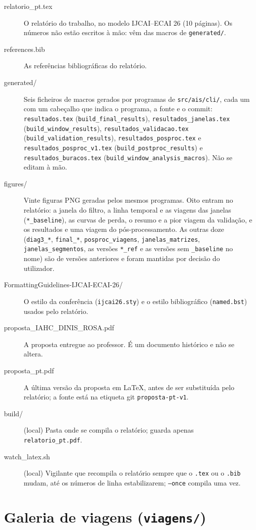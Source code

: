 \documentclass[11pt,a4paper]{article}
\newcommand{\f}[1]{\texttt{#1}}
\begin{document}
\begin{description}
\item[relatorio\_pt.tex] O relatório do trabalho, no modelo IJCAI--ECAI 26 (10 páginas). Os números
  não estão escritos à mão: vêm das macros de \f{generated/}.
\item[references.bib] As referências bibliográficas do relatório.
\item[generated/] Seis ficheiros de macros gerados por programas de \f{src/ais/cli/}, cada um com
  um cabeçalho que indica o programa, a fonte e o commit: \f{resultados.tex}
  (\f{build\_final\_results}), \f{resultados\_janelas.tex} (\f{build\_window\_results}),
  \f{resultados\_validacao.tex} (\f{build\_validation\_results}), \f{resultados\_posproc.tex} e
  \f{resultados\_posproc\_v1.tex} (\f{build\_postproc\_results}) e \f{resultados\_buracos.tex}
  (\f{build\_window\_analysis\_macros}). Não se editam à mão.
\item[figures/] Vinte figuras PNG geradas pelos mesmos programas. Oito entram no relatório: a
  janela do filtro, a linha temporal e as viagens das janelas (\f{*\_baseline}), as curvas de
  perda, o resumo e a pior viagem da validação, e os resultados e uma viagem do pós-processamento.
  As outras doze (\f{diag3\_*}, \f{final\_*}, \f{posproc\_viagens}, \f{janelas\_matrizes},
  \f{janelas\_segmentos}, as versões \f{*\_ref} e as versões sem \f{\_baseline} no nome) são de
  versões anteriores e foram mantidas por decisão do utilizador.
\item[FormattingGuidelines-IJCAI-ECAI-26/] O estilo da conferência (\f{ijcai26.sty}) e o estilo
  bibliográfico (\f{named.bst}) usados pelo relatório.
\item[proposta\_IAHC\_DINIS\_ROSA.pdf] A proposta entregue ao professor. É um documento histórico
  e não se altera.
\item[proposta\_pt.pdf] A última versão da proposta em LaTeX, antes de ser substituída pelo
  relatório; a fonte está na etiqueta git \f{proposta-pt-v1}.
\item[build/] (local) Pasta onde se compila o relatório; guarda apenas \f{relatorio\_pt.pdf}.
\item[watch\_latex.sh] (local) Vigilante que recompila o relatório sempre que o \f{.tex} ou o
  \f{.bib} mudam, até os números de linha estabilizarem; \f{--once} compila uma vez.
\end{description}

\section{Galeria de viagens (\f{viagens/})}\label{sec:viagens}
\end{document}
